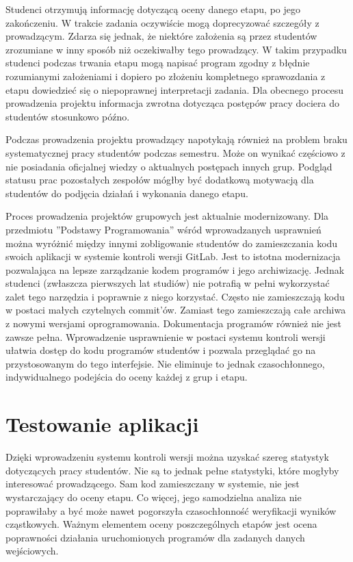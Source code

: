 Studenci otrzymują informację dotyczącą oceny danego etapu, po jego zakończeniu.
W trakcie zadania oczywiście mogą doprecyzować szczegóły z prowadzącym.
Zdarza się jednak, że niektóre założenia są przez studentów zrozumiane w inny sposób niż oczekiwałby tego prowadzący.
W takim przypadku studenci podczas trwania etapu mogą napisać program zgodny z błędnie rozumianymi założeniami i dopiero po złożeniu kompletnego sprawozdania z etapu dowiedzieć się o niepoprawnej interpretacji zadania.
Dla obecnego procesu prowadzenia projektu informacja zwrotna dotycząca postępów pracy dociera do studentów stosunkowo późno.

Podczas prowadzenia projektu prowadzący napotykają również na problem braku systematycznej pracy studentów podczas semestru.
Może on wynikać częściowo z nie posiadania oficjalnej wiedzy o aktualnych postępach innych grup.
Podgląd statusu prac pozostałych zespołów mógłby być dodatkową motywacją dla studentów do podjęcia działań i wykonania danego etapu.

Proces prowadzenia projektów grupowych jest aktualnie modernizowany.
Dla przedmiotu ”Podstawy Programowania” wśród wprowadzanych usprawnień można wyróżnić między innymi zobligowanie studentów do zamieszczania kodu swoich aplikacji w systemie kontroli wersji GitLab.
Jest to istotna modernizacja pozwalająca na lepsze zarządzanie kodem programów i jego archiwizację.
Jednak studenci (zwłaszcza pierwszych lat studiów) nie potrafią w pełni wykorzystać zalet tego narzędzia i poprawnie z niego korzystać.
Często nie zamieszczają kodu w postaci małych czytelnych commit'ów.
Zamiast tego zamieszczają całe archiwa z nowymi wersjami oprogramowania.
Dokumentacja programów również nie jest zawsze pełna.
Wprowadzenie usprawnienie w postaci systemu kontroli wersji ułatwia dostęp do kodu programów studentów i pozwala przeglądać go na przystosowanym do tego interfejsie. 
Nie eliminuje to jednak czasochłonnego, indywidualnego podejścia do oceny każdej z grup i etapu.


\section{Testowanie aplikacji}
\label{programs-testing}

Dzięki wprowadzeniu systemu kontroli wersji można uzyskać szereg statystyk dotyczących pracy studentów.
Nie są to jednak pełne statystyki, które mogłyby interesować prowadzącego.
Sam kod zamieszczany w systemie, nie jest wystarczający do oceny etapu.
Co więcej, jego samodzielna analiza nie poprawiłaby a być może nawet pogorszyła czasochłonność weryfikacji wyników cząstkowych.
Ważnym elementem oceny poszczególnych etapów jest ocena poprawności działania uruchomionych programów dla zadanych danych wejściowych.


